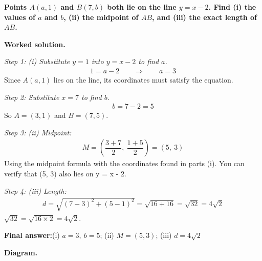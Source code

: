 \documentclass[11pt]{article}
\newcommand{\question}[1]{\par\medskip\noindent\textbf{#1}\par}
\begin{document}
\question{Points \( A(a, 1) \) and \( B(7, b) \) both lie on the line \( y = x - 2 \). Find (i) the values of \( a \) and \( b \), (ii) the midpoint of \( AB \), and (iii) the exact length of \( AB \).}

\textbf{Worked solution.}

\textit{Step 1: (i) Substitute \( y = 1 \) into \( y = x - 2 \) to find \( a \).}
\[\begin{gathered}
1 = a - 2 \quad\quad \Rightarrow \quad\quad a = 3
\end{gathered}\]
Since \(A(a, 1)\) lies on the line, its coordinates must satisfy the equation.

\textit{Step 2: Substitute \( x = 7 \) to find \( b \).}
\[\begin{gathered}
b = 7 - 2 = 5
\end{gathered}\]
So \(A = (3, 1)\) and \(B = (7, 5)\).

\textit{Step 3: (ii) Midpoint:}
\[\begin{gathered}
M = \left(\dfrac{3 + 7}{2},\ \dfrac{1 + 5}{2}\right) = (5,\ 3)
\end{gathered}\]
Using the midpoint formula with the coordinates found in parts (i). You can verify that (5, 3) also lies on y = x - 2.

\textit{Step 4: (iii) Length:}
\[\begin{gathered}
d = \sqrt{(7 - 3)^2 + (5 - 1)^2} = \sqrt{16 + 16} = \sqrt{32} = 4\sqrt{2}
\end{gathered}\]
\(\sqrt{32} = \sqrt{16 \times 2} = 4\sqrt{2}\).

\begin{answerbox}
\textbf{Final answer:}\quad (i) \(\displaystyle a = 3,\ b = 5\); (ii) \(\displaystyle M = (5, 3)\); (iii) \(\displaystyle d = 4\sqrt{2}\)
\end{answerbox}
\textbf{Diagram.}
\end{document}
